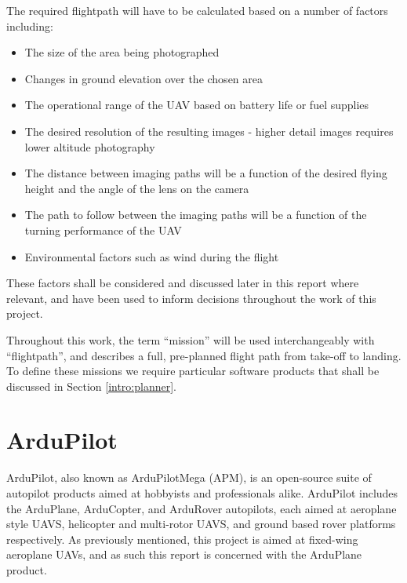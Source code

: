 The required flightpath will have to be calculated based on a number of factors including:
\begin{itemize}
	\item The size of the area being photographed
	\item Changes in ground elevation over the chosen area
	\item The operational range of the UAV based on battery life or fuel supplies
	\item The desired resolution of the resulting images - higher detail images requires lower altitude photography
	\item The distance between imaging paths will be a function of the desired flying height and the angle of the lens on the camera
	\item The path to follow between the imaging paths will be a function of the turning performance of the UAV
	\item Environmental factors such as wind during the flight
\end{itemize}

These factors shall be considered and discussed later in this report where relevant, and have been used to inform decisions throughout the work of this project.

Throughout this work, the term ``mission'' will be used interchangeably with ``flightpath'', and describes a full, pre-planned flight path from take-off to landing. To define these missions we require particular software products that shall be discussed in Section \ref{intro:planner}.

\section{ArduPilot} 
\label{intro:ardupilot}

ArduPilot, also known as ArduPilotMega (APM), is an open-source suite of autopilot products aimed at hobbyists and professionals alike. ArduPilot includes the ArduPlane, ArduCopter, and ArduRover autopilots, each aimed at aeroplane style UAVS, helicopter and multi-rotor UAVS, and ground based rover platforms respectively. As previously mentioned, this project is aimed at fixed-wing aeroplane UAVs, and as such this report is concerned with the ArduPlane product. 


